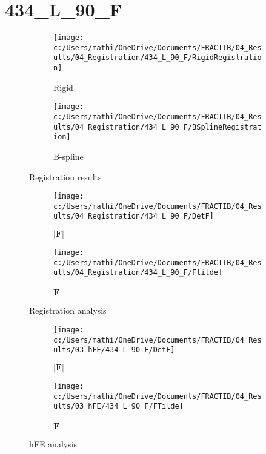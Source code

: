 \documentclass{article}%
\begin{document}
%
\newpage%
\section*{434\_L\_90\_F}%
\label{sec:434L90F}%


\begin{figure}[h!]%
\begin{subfigure}[b]{0.5\linewidth}%
\texttt{[image: c:/Users/mathi/OneDrive/Documents/FRACTIB/04\_Results/04\_Registration/434\_L\_90\_F/RigidRegistration]}%
\caption{Rigid}%
\end{subfigure}%
\begin{subfigure}[b]{0.5\linewidth}%
\texttt{[image: c:/Users/mathi/OneDrive/Documents/FRACTIB/04\_Results/04\_Registration/434\_L\_90\_F/BSplineRegistration]}%
\caption{B{-}spline}%
\end{subfigure}%
\caption{Registration results}%
\end{figure}

%


\begin{figure}[h!]%
\begin{subfigure}[b]{0.5\linewidth}%
\texttt{[image: c:/Users/mathi/OneDrive/Documents/FRACTIB/04\_Results/04\_Registration/434\_L\_90\_F/DetF]}%
\caption{$|\mathbf{F}|$}%
\end{subfigure}%
\begin{subfigure}[b]{0.5\linewidth}%
\texttt{[image: c:/Users/mathi/OneDrive/Documents/FRACTIB/04\_Results/04\_Registration/434\_L\_90\_F/Ftilde]}%
\caption{$\tilde{\mathbf{F}}$}%
\end{subfigure}%
\caption{Registration analysis}%
\end{figure}

%


\begin{figure}[h!]%
\begin{subfigure}[b]{0.5\linewidth}%
\texttt{[image: c:/Users/mathi/OneDrive/Documents/FRACTIB/04\_Results/03\_hFE/434\_L\_90\_F/DetF]}%
\caption{$|\mathbf{F}|$}%
\end{subfigure}%
\begin{subfigure}[b]{0.5\linewidth}%
\texttt{[image: c:/Users/mathi/OneDrive/Documents/FRACTIB/04\_Results/03\_hFE/434\_L\_90\_F/FTilde]}%
\caption{$\tilde{\mathbf{F}}$}%
\end{subfigure}%
\caption{hFE analysis}%
\end{figure}
\end{document}
